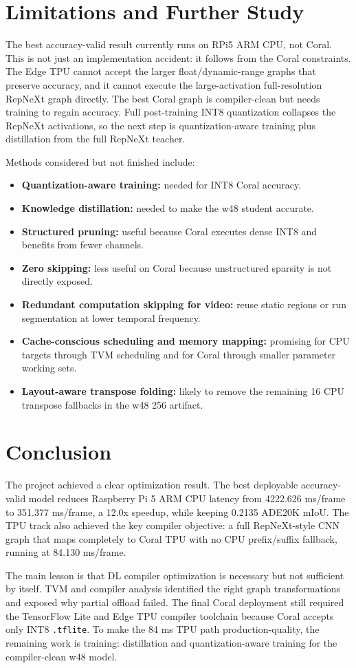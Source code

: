 \documentclass[11pt]{article}
\begin{document}
\section{Limitations and Further Study}

The best accuracy-valid result currently runs on RPi5 ARM CPU, not Coral. This is not just an implementation accident: it follows from the Coral constraints. The Edge TPU cannot accept the larger float/dynamic-range graphs that preserve accuracy, and it cannot execute the large-activation full-resolution RepNeXt graph directly. The best Coral graph is compiler-clean but needs training to regain accuracy. Full post-training INT8 quantization collapses the RepNeXt activations, so the next step is quantization-aware training plus distillation from the full RepNeXt teacher.

Methods considered but not finished include:

\begin{itemize}[leftmargin=*]
  \item \textbf{Quantization-aware training:} needed for INT8 Coral accuracy.
  \item \textbf{Knowledge distillation:} needed to make the w48 student accurate.
  \item \textbf{Structured pruning:} useful because Coral executes dense INT8 and benefits from fewer channels.
  \item \textbf{Zero skipping:} less useful on Coral because unstructured sparsity is not directly exposed.
  \item \textbf{Redundant computation skipping for video:} reuse static regions or run segmentation at lower temporal frequency.
  \item \textbf{Cache-conscious scheduling and memory mapping:} promising for CPU targets through TVM scheduling and for Coral through smaller parameter working sets.
  \item \textbf{Layout-aware transpose folding:} likely to remove the remaining 16 CPU transpose fallbacks in the w48 256 artifact.
\end{itemize}

\section{Conclusion}

The project achieved a clear optimization result. The best deployable accuracy-valid model reduces Raspberry Pi 5 ARM CPU latency from 4222.626 ms/frame to 351.377 ms/frame, a 12.0x speedup, while keeping 0.2135 ADE20K mIoU. The TPU track also achieved the key compiler objective: a full RepNeXt-style CNN graph that maps completely to Coral TPU with no CPU prefix/suffix fallback, running at 84.130 ms/frame.

The main lesson is that DL compiler optimization is necessary but not sufficient by itself. TVM and compiler analysis identified the right graph transformations and exposed why partial offload failed. The final Coral deployment still required the TensorFlow Lite and Edge TPU compiler toolchain because Coral accepts only INT8 \texttt{.tflite}. To make the 84 ms TPU path production-quality, the remaining work is training: distillation and quantization-aware training for the compiler-clean w48 model.
\end{document}

